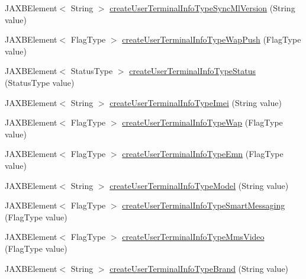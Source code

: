 \begin{DoxyCompactItemize}
\item 
JAXBElement$<$ String $>$ \hyperlink{classcom_1_1telefonica_1_1schemas_1_1unica_1_1rest_1_1directory_1_1v1_1_1ObjectFactory_ab2ab3f5a362f903db1d462ee49b508d4}{createUserTerminalInfoTypeSyncMlVersion} (String value)
\item 
JAXBElement$<$ FlagType $>$ \hyperlink{classcom_1_1telefonica_1_1schemas_1_1unica_1_1rest_1_1directory_1_1v1_1_1ObjectFactory_ad14cff5250492fe0b6b4b37526fbf891}{createUserTerminalInfoTypeWapPush} (FlagType value)
\item 
JAXBElement$<$ StatusType $>$ \hyperlink{classcom_1_1telefonica_1_1schemas_1_1unica_1_1rest_1_1directory_1_1v1_1_1ObjectFactory_a43e4b113a854b539b32a3d40b8f0f652}{createUserTerminalInfoTypeStatus} (StatusType value)
\item 
JAXBElement$<$ String $>$ \hyperlink{classcom_1_1telefonica_1_1schemas_1_1unica_1_1rest_1_1directory_1_1v1_1_1ObjectFactory_aa9a401cc171fc88be6c5c03be206456a}{createUserTerminalInfoTypeImei} (String value)
\item 
JAXBElement$<$ FlagType $>$ \hyperlink{classcom_1_1telefonica_1_1schemas_1_1unica_1_1rest_1_1directory_1_1v1_1_1ObjectFactory_ad5128aa0470d105535e887380804e4e1}{createUserTerminalInfoTypeWap} (FlagType value)
\item 
JAXBElement$<$ FlagType $>$ \hyperlink{classcom_1_1telefonica_1_1schemas_1_1unica_1_1rest_1_1directory_1_1v1_1_1ObjectFactory_a1f3f6191ae8abad0125740997f073fea}{createUserTerminalInfoTypeEmn} (FlagType value)
\item 
JAXBElement$<$ String $>$ \hyperlink{classcom_1_1telefonica_1_1schemas_1_1unica_1_1rest_1_1directory_1_1v1_1_1ObjectFactory_af53d8ff530a67f70ec7a003dbb1de723}{createUserTerminalInfoTypeModel} (String value)
\item 
JAXBElement$<$ FlagType $>$ \hyperlink{classcom_1_1telefonica_1_1schemas_1_1unica_1_1rest_1_1directory_1_1v1_1_1ObjectFactory_abd165350bc8da66dcd9c5ba4b966cb31}{createUserTerminalInfoTypeSmartMessaging} (FlagType value)
\item 
JAXBElement$<$ FlagType $>$ \hyperlink{classcom_1_1telefonica_1_1schemas_1_1unica_1_1rest_1_1directory_1_1v1_1_1ObjectFactory_ab9f41193f74e25898f0910c82e577d53}{createUserTerminalInfoTypeMmsVideo} (FlagType value)
\item 
JAXBElement$<$ String $>$ \hyperlink{classcom_1_1telefonica_1_1schemas_1_1unica_1_1rest_1_1directory_1_1v1_1_1ObjectFactory_a51ee5626fa6e4d0c2894fc04d96bb63a}{createUserTerminalInfoTypeBrand} (String value)
\item 

\end{DoxyCompactItemize}
